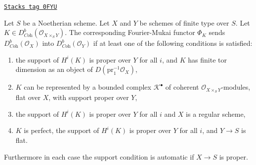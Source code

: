 \begin{lemma}
\label{equiv-lemma-fourier-mukai-Coh}
\href{https://stacks.math.columbia.edu/tag/0FYU}{\texttt{Stacks tag 0FYU}}

Let $S$ be a Noetherian scheme. Let $X$ and $Y$ be schemes of finite type
over $S$. Let $K \in D^b_{\textit{Coh}}(\mathcal{O}_{X \times_S Y})$.
The corresponding Fourier-Mukai functor $\Phi_K$ sends
$D^b_{\textit{Coh}}(\mathcal{O}_X)$ into $D^b_{\textit{Coh}}(\mathcal{O}_Y)$
if at least one of the following conditions is satisfied:
\begin{enumerate}
\item the support of $H^i(K)$ is proper over $Y$ for all $i$, and $K$
has finite tor dimension as an object of $D(\text{pr}_1^{-1}\mathcal{O}_X)$,
\item $K$ can be represented by a bounded complex $\mathcal{K}^\bullet$
of coherent $\mathcal{O}_{X \times_S Y}$-modules, flat over $X$, with support
proper over $Y$,
\item the support of $H^i(K)$ is proper over $Y$ for all $i$
and $X$ is a regular scheme,
\item $K$ is perfect, the support of $H^i(K)$ is proper over $Y$ for all $i$,
and $Y \to S$ is flat.
\end{enumerate}
Furthermore in each case the support condition is automatic
if $X \to S$ is proper.
\end{lemma}

